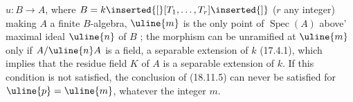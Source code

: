$u:B\longrightarrow A$, where $B=k\inserted{[}[T_1,\ldots,T_r]\inserted{]}$ ($r$ any integer) making $A$ a finite $B$-algebra, $\uline{m}$ is the only point of $\operatorname{Spec}(A)$ above'  maximal ideal  $\uline{n}$ of $B$ ;  the morphism  can be unramified at $\uline{m}$ only if $A/\uline{n}A$ is a field, a separable extension of $k$ (17.4.1), which implies that the residue field $K$ of $A$ is a separable extension of $k$. If this condition is not satisfied, the conclusion of (18.11.5) can never be satisfied for $\uline{p}=\uline{m}$, whatever the integer $m$.

